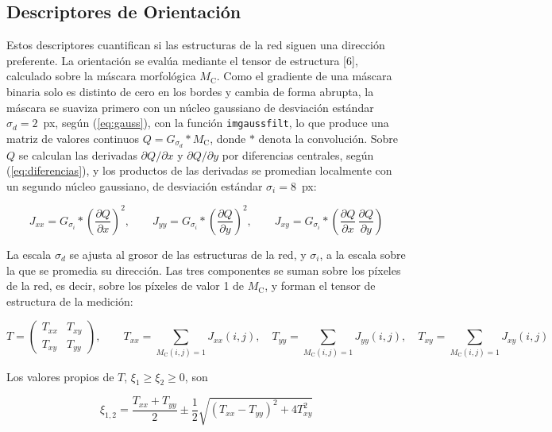 \subsection{Descriptores de Orientación}

Estos descriptores cuantifican si las estructuras de la red siguen una dirección preferente. La orientación se evalúa mediante el tensor de estructura [6], calculado sobre la máscara morfológica $M_{\mathrm{C}}$. Como el gradiente de una máscara binaria solo es distinto de cero en los bordes y cambia de forma abrupta, la máscara se suaviza primero con un núcleo gaussiano de desviación estándar $\sigma_d = 2$~px, según (\ref{eq:gauss}), con la función \texttt{imgaussfilt}, lo que produce una matriz de valores continuos $Q = G_{\sigma_d} * M_{\mathrm{C}}$, donde $*$ denota la convolución. Sobre $Q$ se calculan las derivadas $\partial Q/\partial x$ y $\partial Q/\partial y$ por diferencias centrales, según (\ref{eq:diferencias}), y los productos de las derivadas se promedian localmente con un segundo núcleo gaussiano, de desviación estándar $\sigma_i = 8$~px:

\begin{equation}
J_{xx} = G_{\sigma_i} * \left(\frac{\partial Q}{\partial x}\right)^2, \qquad
J_{yy} = G_{\sigma_i} * \left(\frac{\partial Q}{\partial y}\right)^2, \qquad
J_{xy} = G_{\sigma_i} * \left(\frac{\partial Q}{\partial x}\,\frac{\partial Q}{\partial y}\right)
\label{eq:tensor_local}
\end{equation}

La escala $\sigma_d$ se ajusta al grosor de las estructuras de la red, y $\sigma_i$, a la escala sobre la que se promedia su dirección. Las tres componentes se suman sobre los píxeles de la red, es decir, sobre los píxeles de valor 1 de $M_{\mathrm{C}}$, y forman el tensor de estructura de la medición:

\begin{equation}
T =
\begin{pmatrix}
T_{xx} & T_{xy} \\
T_{xy} & T_{yy}
\end{pmatrix}, \qquad
T_{xx} = \sum_{M_{\mathrm{C}}(i,j) = 1} J_{xx}(i,j), \quad
T_{yy} = \sum_{M_{\mathrm{C}}(i,j) = 1} J_{yy}(i,j), \quad
T_{xy} = \sum_{M_{\mathrm{C}}(i,j) = 1} J_{xy}(i,j)
\label{eq:tensor}
\end{equation}

Los valores propios de $T$, $\xi_1 \ge \xi_2 \ge 0$, son

\begin{equation}
\xi_{1,2} = \frac{T_{xx} + T_{yy}}{2} \pm \frac{1}{2}\sqrt{(T_{xx} - T_{yy})^2 + 4T_{xy}^2}
\label{eq:valores_propios}
\end{equation}

